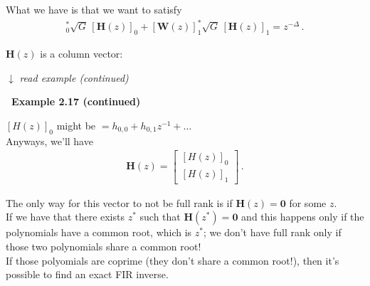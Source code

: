 \documentclass[a4paper, 12pt]{book}
\begin{document}
\begin{tcolorbox}[colback=white, colframe=obsidianBorderPurple, boxrule=1pt, rounded corners]
    What we have is that we want to satisfy
    \begin{align}
        [\mathbf{W}(z)]_0^* \sqrt{G} \, [\mathbf{H}(z)]_0 + [\mathbf{W}(z)]_1^* \sqrt{G} \, [\mathbf{H}(z)]_1 = z^{-\Delta} \,.
    \end{align}

    $\mathbf{H}(z)$ is a column vector:
    
    \begin{center}
    $\downarrow$ \textit{read example (continued)}
    \end{center}
\end{tcolorbox}

\clearpage 

\begin{tcolorbox}[colback=white, colframe=obsidianBorderPurple, boxrule=1pt, rounded corners]
    \textcolor{obsidianTextPurple}{\textbf{\faList\ Example 2.17 (continued)}}

    \begin{center}
    \end{center}

    $[H(z)]_0$ might be $= h_{0,0} + h_{0,1}z^{-1} + \dots$\\
    Anyways, we'll have
    \begin{align}
        \mathbf{H}(z) = \begin{bmatrix} [H(z)]_0 \\ [H(z)]_1 \end{bmatrix} \,.
    \end{align}

    The only way for this vector to not be full rank is if $\mathbf{H}(z) = \mathbf{0}$ for some $z$.\\
    If we have that there exists $z^*$ such that $\mathbf{H}(z^*) = \mathbf{0}$ and this happens only if the polynomials have a common root, which is $z^*$; we don't have full rank only if those two polynomials share a common root!\\
    If those polyomials are coprime (they don't share a common root!), then it's possible to find an exact FIR inverse.


\end{tcolorbox}
\end{document}
